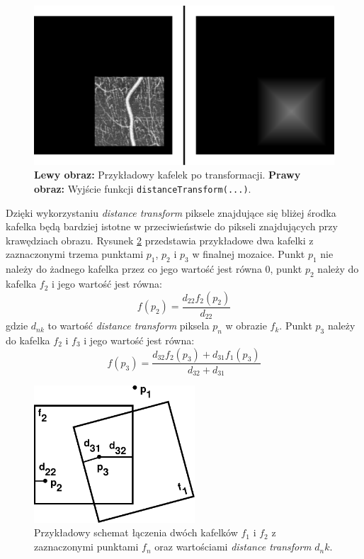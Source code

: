 \begin{figure}[htb]
  \centering
  \includegraphics[width=\textwidth]{gfx/dis}
  \caption{\textbf{Lewy obraz:} Przykładowy kafelek po transformacji. \textbf{Prawy obraz:} Wyjście funkcji \texttt{distanceTransform(...)}.}
  \label{fig:proponowane_algorytmy:dis}
\end{figure}

Dzięki wykorzystaniu \textit{distance transform} piksele znajdujące się bliżej środka kafelka będą bardziej istotne w przeciwieństwie do pikseli znajdujących przy krawędziach obrazu. Rysunek \ref{fig:proponowane_algorytmy:blend} przedstawia przykładowe dwa kafelki z zaznaczonymi trzema punktami $p_1$, $p_2$ i $p_3$ w finalnej mozaice. Punkt $p_1$ nie należy do żadnego kafelka przez co jego wartość jest równa $0$, punkt $p_2$ należy do kafelka $f_2$ i jego wartość jest równa:
\begin{equation}
f(p_2) = \frac{d_{22}f_2(p_2)}{d_{22}}
\end{equation}
gdzie $d_{nk}$ to wartość \textit{distance transform} piksela $p_n$ w obrazie $f_k$. Punkt $p_3$ należy do kafelka $f_2$ i $f_3$ i jego wartość jest równa:
\begin{equation}
f(p_3) = \frac{d_{32}f_2(p_3) + d_{31}f_1(p_3)}{d_{32} + d_{31}}
\end{equation}
\begin{figure}[htb]
  \centering
  \includegraphics[width=6cm]{gfx/blend}
  \caption{Przykładowy schemat łączenia dwóch kafelków $f_1$ i $f_2$ z zaznaczonymi punktami $f_n$ oraz wartościami \textit{distance transform} $d_nk$.}
  \label{fig:proponowane_algorytmy:blend}
\end{figure}

